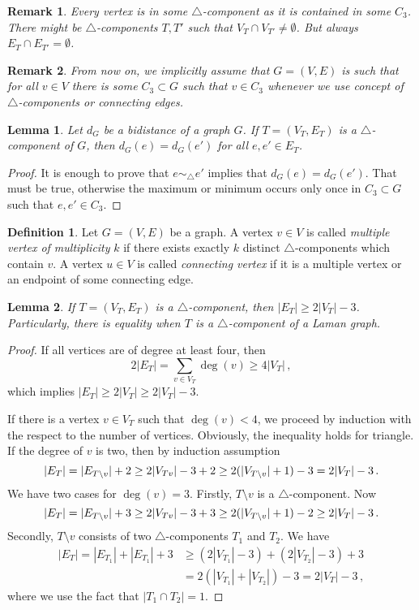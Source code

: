 \documentclass[a4paper, 11pt]{article}
\newcommand{\trcomp}{$\triangle$-component}
\newcommand{\trcomps}{$\triangle$-components}
\newtheorem{lem}{Lemma}[section]
\newtheorem*{rem}{Remark}
\theoremstyle{definition}
\newtheorem{defn}{Definition}[section]
\begin{document}
\begin{rem}
Every vertex is in some \trcomp{} as it is contained in some $C_3$. There might be \trcomps{} $T,T'$ such that $V_T \cap V_{T'}\neq \emptyset$. But always $E_T \cap E_{T'}= \emptyset$.
\end{rem}

\begin{rem}
From now on, we implicitly assume that $G=(V,E)$ is such that for all $v\in V$ there is some $C_3\subset G$ such that $v\in C_3$ whenever we use concept of \trcomps{} or connecting edges.
\end{rem}

\begin{lem}
Let $d_G$ be a bidistance of a graph $G$. If $T=(V_T, E_T)$ is a \trcomp{} of $G$, then $d_G(e)=d_G(e')$ for all $e,e'\in E_T$.
\end{lem}
\begin{proof}
It is enough to prove that $e \sim_{\!\!\bigtriangleup} e'$ implies that $d_G(e)=d_G(e')$. That must be true, otherwise the maximum or minimum occurs only once in $C_3\subset G$ such that $e,e'\in C_3$.
\end{proof}





\begin{defn}
Let $G=(V,E)$ be a graph. A vertex $v\in V$ is called \emph{multiple vertex of multiplicity} $k$ if there exists exactly $k$ distinct \trcomps{} which contain $v$. A vertex $u\in V$ is called \emph{connecting vertex} if it is a multiple vertex or an endpoint of some connecting edge.
\end{defn}

\begin{lem}
If $T=(V_T, E_T)$ is a \trcomp{}, then $|E_T|\geq 2|V_T|-3$. Particularly, there is equality when $T$ is a \trcomp{} of a Laman graph.
\label{lem:sizeTriangleComponent}
\end{lem}
\begin{proof}
If all vertices are of degree at least four, then $$2|E_T|=\sum_{v\in V_T} \deg(v) \geq 4|V_T|\,,$$ which implies $|E_T|\geq 2|V_T|\geq 2|V_T|-3$.

If there is a vertex $v\in V_T$ such that $\deg(v)<4$, we proceed by induction with the respect to the number of vertices. Obviously, the inequality holds for triangle. If the degree of $v$ is two, then by induction assumption
$$
|E_T|=|E_{T\setminus v}|+2\geq 2 |V_{T\\v}|-3 +2\geq 2 (|V_{T\setminus v}|+1)-3=2 |V_{T}|-3\,.
$$
We have two cases for $\deg(v)=3$. Firstly, $T\setminus v$ is a \trcomp{}. Now $$|E_T|=|E_{T\setminus v}|+3\geq 2 |V_{T\\v}|-3 +3\geq 2 (|V_{T\setminus v}|+1)-2\geq 2 |V_{T}|-3\,.$$ Secondly, $T\setminus v$ consists of two \trcomps{} $T_1$ and $T_2$. We have
\begin{align*}
|E_T|=|E_{T_1}|+|E_{T_1}|+3 &\geq (2 |V_{T_1}|-3)+(2 |V_{T_2}|-3) +3 \\
			&= 2(|V_{T_1}| +|V_{T_2}|)-3=2 |V_{T}|-3\,,
\end{align*}
where we use the fact that $|T_1 \cap T_2|=1$.
\end{proof}
\end{document}
